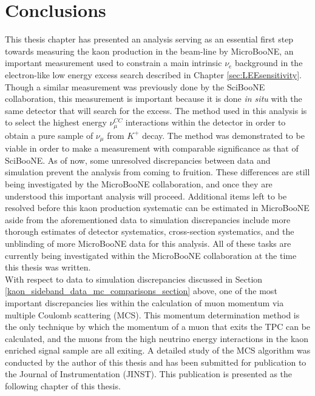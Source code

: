 \section{Conclusions}
This thesis chapter has presented an analysis serving as an essential first step towards measuring the kaon production in the beam-line by MicroBooNE, an important measurement used to constrain a main intrinsic $\nu_e$ background in the electron-like low energy excess search described in Chapter \ref{sec:LEEsensitivity}. Though a similar measurement was previously done by the SciBooNE collaboration, this measurement is important because it is done \textit{in situ} with the same detector that will search for the excess. The method used in this analysis is to select the highest energy $\nu_\mu^{CC}$ interactions within the detector in order to obtain a pure sample of $\nu_\mu$ from $K^+$ decay. The method was demonstrated to be viable in order to make a measurement with comparable significance as that of SciBooNE. As of now, some unresolved discrepancies between data and simulation prevent the analysis from coming to fruition. These differences are still being investigated by the MicroBooNE collaboration, and once they are understood this important analysis will proceed. Additional items left to be resolved before this kaon production systematic can be estimated in MicroBooNE aside from the aforementioned data to simulation discrepancies include more thorough estimates of detector systematics, cross-section systematics, and the unblinding of more MicroBooNE data for this analysis. All of these tasks are currently being investigated within the MicroBooNE collaboration at the time this thesis was written.\\

With respect to data to simulation discrepancies discussed in Section \ref{kaon_sideband_data_mc_comparisons_section} above, one of the most important discrepancies lies within the calculation of muon momentum via multiple Coulomb scattering (MCS). This momentum determination method is the only technique by which the momentum of a muon that exits the TPC can be calculated, and the muons from the high neutrino energy interactions in the kaon enriched signal sample are all exiting. A detailed study of the MCS algorithm was conducted by the author of this thesis and has been submitted for publication to the Journal of Instrumentation (JINST). This publication is presented as the following chapter of this thesis. 